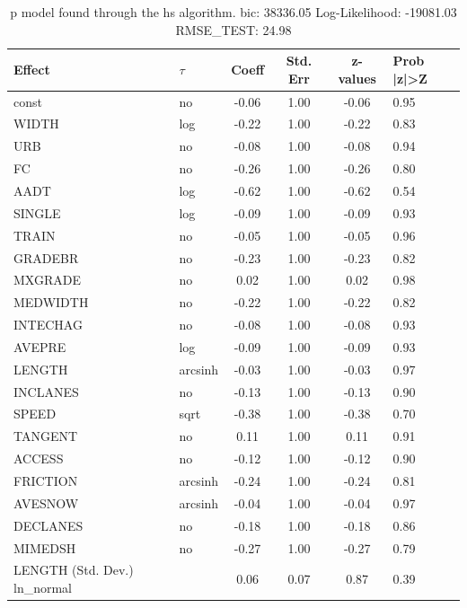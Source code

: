 \begin{table}
	\caption{p model found through the hs algorithm. bic: 38336.05 Log-Likelihood: -19081.03 RMSE_TEST: 24.98}
	\begin{center}
		\begin{tabular}{|l|l|c|c|c|l|}
			\hline
			Effect & $\tau$ & Coeff & Std. Err & z-values & Prob |z|>Z \\
			\hline
			const & no & -0.06 & 1.00 & -0.06 & 0.95 \\
			\hline
			WIDTH & log & -0.22 & 1.00 & -0.22 & 0.83 \\
			\hline
			URB & no & -0.08 & 1.00 & -0.08 & 0.94 \\
			\hline
			FC & no & -0.26 & 1.00 & -0.26 & 0.80 \\
			\hline
			AADT & log & -0.62 & 1.00 & -0.62 & 0.54 \\
			\hline
			SINGLE & log & -0.09 & 1.00 & -0.09 & 0.93 \\
			\hline
			TRAIN & no & -0.05 & 1.00 & -0.05 & 0.96 \\
			\hline
			GRADEBR & no & -0.23 & 1.00 & -0.23 & 0.82 \\
			\hline
			MXGRADE & no & 0.02 & 1.00 & 0.02 & 0.98 \\
			\hline
			MEDWIDTH & no & -0.22 & 1.00 & -0.22 & 0.82 \\
			\hline
			INTECHAG & no & -0.08 & 1.00 & -0.08 & 0.93 \\
			\hline
			AVEPRE & log & -0.09 & 1.00 & -0.09 & 0.93 \\
			\hline
			LENGTH & arcsinh & -0.03 & 1.00 & -0.03 & 0.97 \\
			\hline
			INCLANES & no & -0.13 & 1.00 & -0.13 & 0.90 \\
			\hline
			SPEED & sqrt & -0.38 & 1.00 & -0.38 & 0.70 \\
			\hline
			TANGENT & no & 0.11 & 1.00 & 0.11 & 0.91 \\
			\hline
			ACCESS & no & -0.12 & 1.00 & -0.12 & 0.90 \\
			\hline
			FRICTION & arcsinh & -0.24 & 1.00 & -0.24 & 0.81 \\
			\hline
			AVESNOW & arcsinh & -0.04 & 1.00 & -0.04 & 0.97 \\
			\hline
			DECLANES & no & -0.18 & 1.00 & -0.18 & 0.86 \\
			\hline
			MIMEDSH & no & -0.27 & 1.00 & -0.27 & 0.79 \\
			\hline
			LENGTH (Std. Dev.) ln_normal &  & 0.06 & 0.07 & 0.87 & 0.39 \\
			\hline

\end{tabular}
\end{center}
\end{table}
